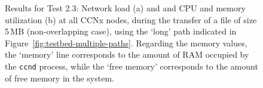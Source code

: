 \begin{figure}[H]
    \centering



    \cprotect\caption{Results for Test 2.3: Network load (a) and and 
        CPU and memory utilization (b) at 
        all CCNx nodes, during the transfer of a file of size 5\,MB 
        (non-overlapping case), using the `long' path indicated in 
        Figure~\ref{fig:testbed-multiple-paths}. Regarding the 
        memory values, the `memory' line corresponds to the amount of RAM 
        occupied by the \verb+ccnd+ process, while the `free memory' corresponds 
        to the amount of free memory in the system.}
    \label{fig:long-route-app}

\end{figure}

